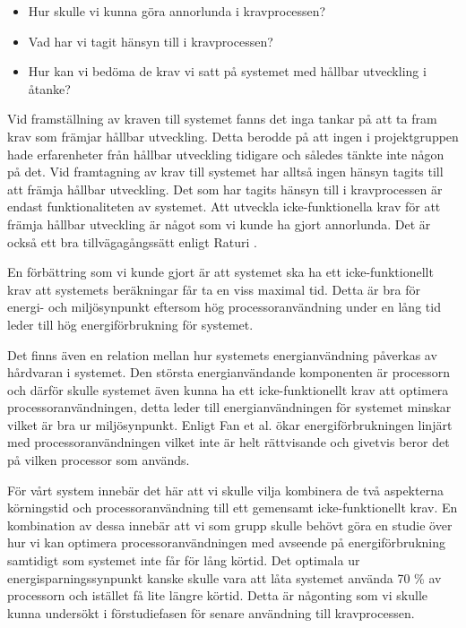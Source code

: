 \begin{itemize}
	\item Hur skulle vi kunna göra annorlunda i kravprocessen?
	\item Vad har vi tagit hänsyn till i kravprocessen?
	\item Hur kan vi bedöma de krav vi satt på systemet med hållbar utveckling i åtanke?
\end{itemize}
Vid framställning av kraven till systemet fanns det inga tankar på att ta fram krav som främjar hållbar utveckling. Detta berodde på att ingen i projektgruppen hade erfarenheter från hållbar utveckling tidigare och således tänkte inte någon på det. Vid framtagning av krav till systemet har alltså ingen hänsyn tagits till att främja hållbar utveckling. Det som har tagits hänsyn till i kravprocessen är endast funktionaliteten av systemet. Att utveckla icke-funktionella krav för att främja hållbar utveckling är något som vi kunde ha gjort annorlunda. Det är också ett bra tillvägagångssätt enligt Raturi \cite{raturi2014developing}. 

En förbättring som vi kunde gjort är att systemet ska ha ett icke-funktionellt krav att systemets beräkningar får ta en viss maximal tid. Detta är bra för energi- och miljösynpunkt eftersom hög processoranvändning under en lång tid leder till hög energiförbrukning för systemet.

Det finns även en relation mellan hur systemets energianvändning påverkas av hårdvaran i systemet. Den största energianvändande komponenten är processorn och därför skulle systemet även kunna ha ett icke-funktionellt krav att optimera processoranvändningen, detta leder till energianvändningen för systemet minskar vilket är bra ur miljösynpunkt. Enligt Fan et al. \cite{fan2007power} ökar energiförbrukningen linjärt med processoranvändningen vilket inte är helt rättvisande och givetvis beror det på vilken processor som används. 

För vårt system innebär det här att vi skulle vilja kombinera de två aspekterna körningstid och processoranvändning till ett gemensamt icke-funktionellt krav. En kombination av dessa innebär att vi som grupp skulle behövt göra en studie över hur vi kan optimera processoranvändningen med avseende på energiförbrukning samtidigt som systemet inte får för lång körtid. Det optimala ur energisparningssynpunkt kanske skulle vara att låta systemet använda 70 \% av processorn och istället få lite längre körtid. Detta är någonting som vi skulle kunna undersökt i förstudiefasen för senare användning till kravprocessen.

